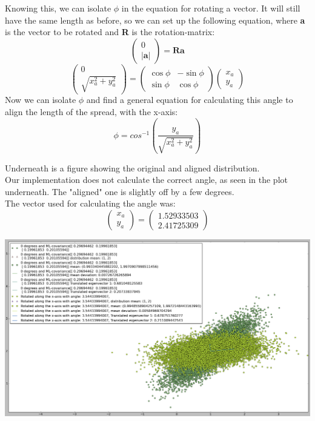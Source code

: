 \documentclass[12pt, a4paper]{article}
\begin{document}
\begin{itemize}
Knowing this, we can isolate $\phi$ in the equation for rotating a vector. It will still have the same length as before, so we can set up the following equation, where \textbf{a} is the vector to be rotated and \textbf{R} is the rotation-matrix:
\begin{equation*}
\left( \begin{array}{c}
0 \\
|\textbf{a}| \end{array} \right)
=
\textbf{R}\textbf{a}
\end{equation*}
\begin{equation*}
\left( \begin{array}{c}
0 \\
\sqrt{x_a^2+y_a^2} 
\end{array} \right)
=
\left( \begin{array}{cc}
\cos \phi & -\sin \phi \\
\sin \phi & \cos \phi \end{array} \right)
\left( \begin{array}{c}
x_a \\
y_a \end{array} \right)
\end{equation*} 
Now we can isolate $\phi$ and find a general equation for calculating this angle to align the length of the spread, with the x-axis:
\begin{equation*}
\phi = cos^{-1}\left(\dfrac{y_a}{\sqrt{x_a^2+y_a^2}}\right)
\end{equation*}

Underneath is a figure showing the original and aligned distribution.\\
Our implementation does not calculate the correct angle, as seen in the plot underneath. The "aligned" one is slightly off by a few degrees.\\
The vector used for calculating the angle was: 
\begin{equation*}
\left( \begin{array}{c}
x_a \\
y_a \end{array} \right) = \left( \begin{array}{c}
1.52933503 \\
2.41725309 \end{array} \right)
\end{equation*}

\includegraphics[width=\textwidth]{7.png}


\end{itemize}
\end{document}
